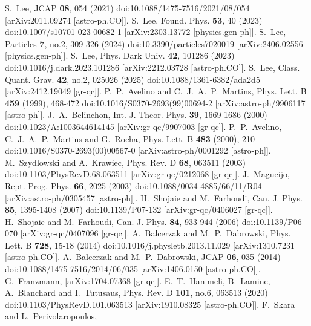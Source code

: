 \documentclass[jkps,preprint,fleqn]{revtex4}
\begin{document}
\begin{CJK*}{UTF8}{gbsn}
\begin{thebibliography}{999}
S.~Lee,
JCAP \textbf{08}, 054 (2021)
doi:10.1088/1475-7516/2021/08/054
[arXiv:2011.09274 [astro-ph.CO]].
S.~Lee,
Found. Phys. \textbf{53}, 40 (2023)
doi:10.1007/s10701-023-00682-1
[arXiv:2303.13772 [physics.gen-ph]].
S.~Lee,
Particles \textbf{7}, no.2, 309-326 (2024)
doi:10.3390/particles7020019
[arXiv:2406.02556 [physics.gen-ph]].
S.~Lee,
Phys. Dark Univ. \textbf{42}, 101286 (2023)
doi:10.1016/j.dark.2023.101286
[arXiv:2212.03728 [astro-ph.CO]].
S.~Lee,
Class. Quant. Grav. \textbf{42}, no.2, 025026 (2025)
doi:10.1088/1361-6382/ada2d5
[arXiv:2412.19049 [gr-qc]].
P.~P.~Avelino and C.~J.~A.~P.~Martins,
Phys. Lett. B \textbf{459} (1999), 468-472
doi:10.1016/S0370-2693(99)00694-2
[arXiv:astro-ph/9906117 [astro-ph]].
J.~A.~Belinchon,
Int. J. Theor. Phys. \textbf{39}, 1669-1686 (2000)
doi:10.1023/A:1003644614145
[arXiv:gr-qc/9907003 [gr-qc]].
P.~P.~Avelino, C.~J.~A.~P.~Martins and G.~Rocha,
Phys. Lett. B \textbf{483} (2000), 210
doi:10.1016/S0370-2693(00)00567-0
[arXiv:astro-ph/0001292 [astro-ph]].
M.~Szydlowski and A.~Krawiec,
Phys. Rev. D \textbf{68}, 063511 (2003)
doi:10.1103/PhysRevD.68.063511
[arXiv:gr-qc/0212068 [gr-qc]].
J.~Magueijo,
Rept. Prog. Phys. \textbf{66}, 2025 (2003)
doi:10.1088/0034-4885/66/11/R04
[arXiv:astro-ph/0305457 [astro-ph]].
H.~Shojaie and M.~Farhoudi,
Can. J. Phys. \textbf{85}, 1395-1408 (2007)
doi:10.1139/P07-132
[arXiv:gr-qc/0406027 [gr-qc]].
H.~Shojaie and M.~Farhoudi,
Can. J. Phys. \textbf{84}, 933-944 (2006)
doi:10.1139/P06-070
[arXiv:gr-qc/0407096 [gr-qc]].
A.~Balcerzak and M.~P.~Dabrowski,
Phys. Lett. B \textbf{728}, 15-18 (2014)
doi:10.1016/j.physletb.2013.11.029
[arXiv:1310.7231 [astro-ph.CO]].
A.~Balcerzak and M.~P.~Dabrowski,
JCAP \textbf{06}, 035 (2014)
doi:10.1088/1475-7516/2014/06/035
[arXiv:1406.0150 [astro-ph.CO]].
G.~Franzmann,
[arXiv:1704.07368 [gr-qc]].
E.~T.~Hanımeli, B.~Lamine, A.~Blanchard and I.~Tutusaus,
Phys. Rev. D \textbf{101}, no.6, 063513 (2020)
doi:10.1103/PhysRevD.101.063513
[arXiv:1910.08325 [astro-ph.CO]].
F.~Skara and L.~Perivolaropoulos,

\end{thebibliography}
\end{CJK*}
\end{document}
